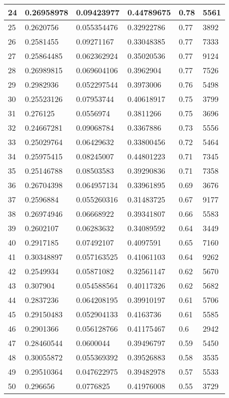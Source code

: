 \begin{longtable}{|l|l|l|l|l|l|}
24 & 0.26958978 & 0.09423977 & 0.44789675 & 0.78 & 5561 \\ \hline 
25 & 0.2620756 & 0.055354476 & 0.32922786 & 0.77 & 3892 \\ \hline 
26 & 0.2581455 & 0.09271167 & 0.33048385 & 0.77 & 7333 \\ \hline 
27 & 0.25864485 & 0.062362924 & 0.35020536 & 0.77 & 9124 \\ \hline 
28 & 0.26989815 & 0.069604106 & 0.3962904 & 0.77 & 7526 \\ \hline 
29 & 0.2982936 & 0.052297544 & 0.3973006 & 0.76 & 5498 \\ \hline 
30 & 0.25523126 & 0.07953744 & 0.40618917 & 0.75 & 3799 \\ \hline 
31 & 0.276125 & 0.0556974 & 0.3811266 & 0.75 & 3696 \\ \hline 
32 & 0.24667281 & 0.09068784 & 0.3367886 & 0.73 & 5556 \\ \hline 
33 & 0.25029764 & 0.06429632 & 0.33800456 & 0.72 & 5464 \\ \hline 
34 & 0.25975415 & 0.08245007 & 0.44801223 & 0.71 & 7345 \\ \hline 
35 & 0.25146788 & 0.08503583 & 0.39290836 & 0.71 & 7358 \\ \hline 
36 & 0.26704398 & 0.064957134 & 0.33961895 & 0.69 & 3676 \\ \hline 
37 & 0.2596884 & 0.055260316 & 0.31483725 & 0.67 & 9177 \\ \hline 
38 & 0.26974946 & 0.06668922 & 0.39341807 & 0.66 & 5583 \\ \hline 
39 & 0.2602107 & 0.06283632 & 0.34089592 & 0.64 & 3449 \\ \hline 
40 & 0.2917185 & 0.07492107 & 0.4097591 & 0.65 & 7160 \\ \hline 
41 & 0.30348897 & 0.057163525 & 0.41061103 & 0.64 & 9262 \\ \hline 
42 & 0.2549934 & 0.05871082 & 0.32561147 & 0.62 & 5670 \\ \hline 
43 & 0.307904 & 0.054588564 & 0.40117326 & 0.62 & 5682 \\ \hline 
44 & 0.2837236 & 0.064208195 & 0.39910197 & 0.61 & 5706 \\ \hline 
45 & 0.29150483 & 0.052904133 & 0.4163736 & 0.61 & 5585 \\ \hline 
46 & 0.2901366 & 0.056128766 & 0.41175467 & 0.6 & 2942 \\ \hline 
47 & 0.28460544 & 0.0600044 & 0.39496797 & 0.59 & 5450 \\ \hline 
48 & 0.30055872 & 0.055369392 & 0.39526883 & 0.58 & 3535 \\ \hline 
49 & 0.29510364 & 0.047622975 & 0.39482978 & 0.57 & 5533 \\ \hline 
50 & 0.296656 & 0.0776825 & 0.41976008 & 0.55 & 3729 \\ \hline 
\end{longtable}